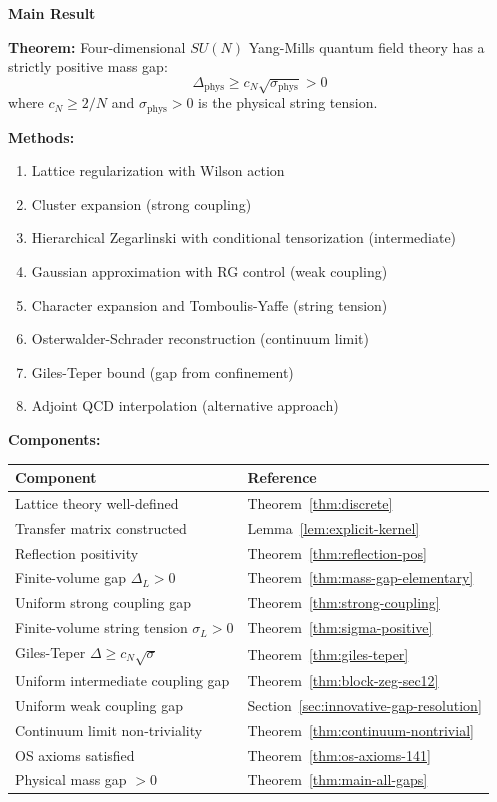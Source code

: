 \begin{tcolorbox}[colback=blue!10,colframe=blue!60!black,title=\textbf{Yang-Mills Mass Gap}]
\begin{center}
\textbf{\large Main Result}
\end{center}

\textbf{Theorem:} Four-dimensional $SU(N)$ Yang-Mills quantum field theory 
has a strictly positive mass gap:
\[
\boxed{\Delta_{\mathrm{phys}} \geq c_N \sqrt{\sigma_{\mathrm{phys}}} > 0}
\]
where $c_N \geq 2/N $ and $\sigma_{\mathrm{phys}} > 0$ is 
the physical string tension.

\textbf{Methods:}
\begin{enumerate}
\item Lattice regularization with Wilson action
\item Cluster expansion (strong coupling)
\item Hierarchical Zegarlinski with conditional tensorization (intermediate)
\item Gaussian approximation with RG control (weak coupling)
\item Character expansion and Tomboulis-Yaffe (string tension)
\item Osterwalder-Schrader reconstruction (continuum limit)
\item Giles-Teper bound (gap from confinement)
\item Adjoint QCD interpolation (alternative approach)
\end{enumerate}

\textbf{Components:}
\begin{center}
\renewcommand{\arraystretch}{1.3}
\begin{tabular}{|l|l|}
\hline
\textbf{Component} & \textbf{Reference} \\
\hline
Lattice theory well-defined & Theorem~\ref{thm:discrete} \\
Transfer matrix constructed & Lemma~\ref{lem:explicit-kernel} \\
Reflection positivity & Theorem~\ref{thm:reflection-pos} \\
Finite-volume gap $\Delta_L > 0$ & Theorem~\ref{thm:mass-gap-elementary} \\
Uniform strong coupling gap & Theorem~\ref{thm:strong-coupling} \\
Finite-volume string tension $\sigma_L > 0$ & Theorem~\ref{thm:sigma-positive} \\
Giles-Teper $\Delta \geq c_N\sqrt{\sigma}$ & Theorem~\ref{thm:giles-teper} \\
Uniform intermediate coupling gap & Theorem~\ref{thm:block-zeg-sec12} \\
Uniform weak coupling gap & Section~\ref{sec:innovative-gap-resolution} \\
Continuum limit non-triviality & Theorem~\ref{thm:continuum-nontrivial} \\
OS axioms satisfied & Theorem~\ref{thm:os-axioms-141} \\
Physical mass gap $> 0$ & Theorem~\ref{thm:main-all-gaps} \\
\hline
\end{tabular}
\end{center}
\end{tcolorbox}


